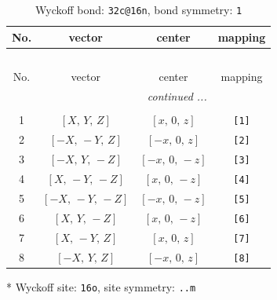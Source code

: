 \documentclass[fleqn,8pt]{jsarticle}
\begin{document}
\renewcommand{\arraystretch}{1.2}
\begin{longtable}{cccc}
\caption{Wyckoff bond: {\tt 32c@16n}, bond symmetry: {\tt 1}}
 \\
 \hline \hline
No. & vector & center & mapping \\ \hline \endfirsthead

\multicolumn{3}{l}{\tablename\ \thetable{}} \\
 \hline \hline
No. & vector & center & mapping \\ \hline \endhead

 \hline \hline
\multicolumn{3}{r}{\footnotesize\it continued ...} \\ \endfoot

 \hline \hline
\multicolumn{3}{r}{} \\ \endlastfoot

1 & $\left[ X,\, Y,\, Z \right]$ & $\left[ x,\, 0,\, z \right]$ & {\tt [1]} \\ \hline
2 & $\left[ - X,\, - Y,\, Z \right]$ & $\left[ - x,\, 0,\, z \right]$ & {\tt [2]} \\ \hline
3 & $\left[ - X,\, Y,\, - Z \right]$ & $\left[ - x,\, 0,\, - z \right]$ & {\tt [3]} \\ \hline
4 & $\left[ X,\, - Y,\, - Z \right]$ & $\left[ x,\, 0,\, - z \right]$ & {\tt [4]} \\ \hline
5 & $\left[ - X,\, - Y,\, - Z \right]$ & $\left[ - x,\, 0,\, - z \right]$ & {\tt [5]} \\ \hline
6 & $\left[ X,\, Y,\, - Z \right]$ & $\left[ x,\, 0,\, - z \right]$ & {\tt [6]} \\ \hline
7 & $\left[ X,\, - Y,\, Z \right]$ & $\left[ x,\, 0,\, z \right]$ & {\tt [7]} \\ \hline
8 & $\left[ - X,\, Y,\, Z \right]$ & $\left[ - x,\, 0,\, z \right]$ & {\tt [8]} \\
\end{longtable}
* Wyckoff site: {\tt 16o}, site symmetry: {\tt ..m}
\renewcommand{\arraystretch}{1.2}
\end{document}
